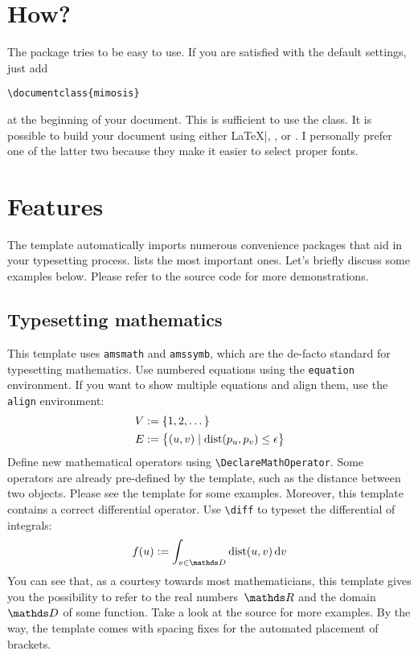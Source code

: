 \section{How?}

The package tries to be easy to use. If you are satisfied with the
default settings, just add
%
\begin{verbatim}
\documentclass{mimosis}
\end{verbatim}
%
at the beginning of your document. This is sufficient to use the class.
It is possible to build your document using either \LaTeX|, \XeLaTeX, or
\LuaLaTeX. I personally prefer one of the latter two because they make
it easier to select proper fonts.

\section{Features}

The template automatically imports numerous convenience packages that
aid in your typesetting process. lists the
most important ones. Let's briefly discuss some examples below. Please
refer to the source code for more demonstrations.

\subsection{Typesetting mathematics}

This template uses \verb|amsmath| and \verb|amssymb|, which are the
de-facto standard for typesetting mathematics. Use numbered equations
using the \verb|equation| environment.
%
If you want to show multiple equations and align them, use the
\verb|align| environment:
%
\begin{align}
    V &:= \{ 1, 2, \dots \}\\
    E &:= \big\{ \left(u,v\right) \mid \dist\left(p_u, p_v\right) \leq \epsilon \big\}
\end{align}
%
Define new mathematical operators using \verb|\DeclareMathOperator|.
Some operators are already pre-defined by the template, such as the
distance between two objects. Please see the template for some examples. 
%
Moreover, this template contains a correct differential operator. Use \verb|\diff| to typeset the differential of integrals:
%
\begin{equation}
  f(u) := \int_{v \in \domain}\dist(u,v)\diff{v}
\end{equation}
%
You can see that, as a courtesy towards most mathematicians, this
template gives you the possibility to refer to the real numbers~$\real$
and the domain~$\domain$ of some function. Take a look at the source for
more examples. By the way, the template comes with spacing fixes for the
automated placement of brackets.

